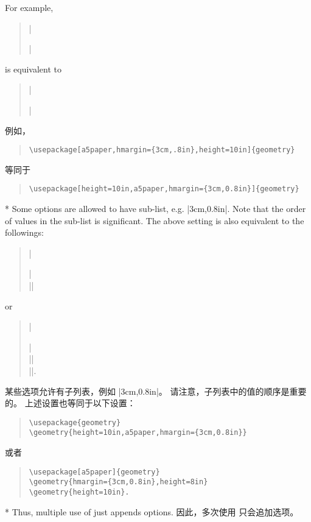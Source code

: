 \begin{paracol}{2}
For example,
\begin{quote}
|\usepackage[a5paper,hmargin={3cm,.8in},height=10in]{geometry}|
\end{quote}
is equivalent to 
\begin{quote}
|\usepackage[height=10in,a5paper,hmargin={3cm,0.8in}]{geometry}|
\end{quote}
\switchcolumn
例如，
\begin{quote}
\begin{verbatim}
\usepackage[a5paper,hmargin={3cm,.8in},height=10in]{geometry}
\end{verbatim}
\end{quote}
等同于
\begin{quote}
\begin{verbatim}
\usepackage[height=10in,a5paper,hmargin={3cm,0.8in}]{geometry}
\end{verbatim}
\end{quote}


\switchcolumn[0]*
Some options are allowed to have sub-list, e.g. |{3cm,0.8in}|.
Note that the order of values in the sub-list is significant.
The above setting is also equivalent to the followings:
\begin{quote}
  |\usepackage{geometry}|\\
  ||
\end{quote}
or 
\begin{quote}
  |\usepackage[a5paper]{geometry}|\\
  ||\\
  |\geometry{height=10in}|.
\end{quote}
\switchcolumn
某些选项允许有子列表，例如 |{3cm,0.8in}|。
请注意，子列表中的值的顺序是重要的。
上述设置也等同于以下设置：
\begin{quote}
\begin{verbatim}
\usepackage{geometry}
\geometry{height=10in,a5paper,hmargin={3cm,0.8in}}
\end{verbatim}
\end{quote}
或者
\begin{quote}
\begin{verbatim}
\usepackage[a5paper]{geometry} 
\geometry{hmargin={3cm,0.8in},height=8in} 
\geometry{height=10in}.
\end{verbatim}
\end{quote}

\switchcolumn[0]*
Thus, multiple use of  just appends options.
\switchcolumn
因此，多次使用  只会追加选项。


\end{paracol}
